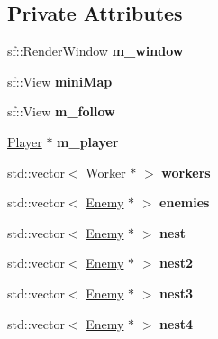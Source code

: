 \subsection*{Private Attributes}
\begin{DoxyCompactItemize}
\item 
\mbox{\label{class_game_a22a61b5ea27c609be8cf2724c33d7ae5}} 
sf\+::\+Render\+Window {\bfseries m\+\_\+window}
\item 
\mbox{\label{class_game_a7631b3b50dd764980ebd57b43ef31f5a}} 
sf\+::\+View {\bfseries mini\+Map}
\item 
\mbox{\label{class_game_a2fa78a9321217a3189c22874437569bc}} 
sf\+::\+View {\bfseries m\+\_\+follow}
\item 
\mbox{\label{class_game_a371bdca8d00e1837a11a06e59fa9f44a}} 
\mbox{\hyperlink{class_player}{Player}} $\ast$ {\bfseries m\+\_\+player}
\item 
\mbox{\label{class_game_adfcf58551ecd8d9c2462f745a667499d}} 
std\+::vector$<$ \mbox{\hyperlink{class_worker}{Worker}} $\ast$ $>$ {\bfseries workers}
\item 
\mbox{\label{class_game_a29e5e11978d28aac90748d484ddd1219}} 
std\+::vector$<$ \mbox{\hyperlink{class_enemy}{Enemy}} $\ast$ $>$ {\bfseries enemies}
\item 
\mbox{\label{class_game_a6eefe1ff7e009858700e7ed1ea86026c}} 
std\+::vector$<$ \mbox{\hyperlink{class_enemy}{Enemy}} $\ast$ $>$ {\bfseries nest}
\item 
\mbox{\label{class_game_a3925e2f941ba1d5146d20ccd29e6b6f9}} 
std\+::vector$<$ \mbox{\hyperlink{class_enemy}{Enemy}} $\ast$ $>$ {\bfseries nest2}
\item 
\mbox{\label{class_game_a5c5253e36a880b0d90211e326cf810f6}} 
std\+::vector$<$ \mbox{\hyperlink{class_enemy}{Enemy}} $\ast$ $>$ {\bfseries nest3}
\item 
\mbox{\label{class_game_aab02c0eda6f87cddbe2b50255771b32a}} 
std\+::vector$<$ \mbox{\hyperlink{class_enemy}{Enemy}} $\ast$ $>$ {\bfseries nest4}

\end{DoxyCompactItemize}
